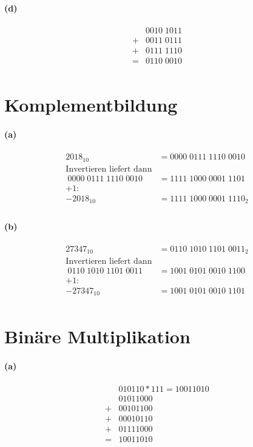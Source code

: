 \documentclass[a4paper]{article}
\begin{document}
\paragraph{(d)}
\begin{align*}
    &0010\;1011\\
    +&0011\;0111\\
    +&0111\;1110\\
    =&0110\;0010\\
\end{align*}


\section{Komplementbildung}
\paragraph{(a)}
\begin{align*}
    2018_{10}&=0000\;0111\;1110\;0010\\
    \text{Invertieren liefert dann}\\
    ~0000\;0111\;1110\;0010 &= 1111\;1000\;0001\;1101\\
    \text{+1:}\\
    -2018_{10} &= 1111\;1000\;0001\;1110_2\\
\end{align*}

\paragraph{(b)}
\begin{align*}
    27347_{10}&=0110\;1010\;1101\;0011_2\\
    \text{Invertieren liefert dann}\\
    ~0110\;1010\;1101\;0011 &= 1001\;0101\;0010\;1100\\
    \text{+1:}\\
    -27347_{10} &= 1001\;0101\;0010\;1101\\
\end{align*}

\section{Binäre Multiplikation}
\paragraph{(a)}
\begin{align*}
    &010110*111=10011010\\
    &01011000\\
    +&00101100\\
    +&00010110\\
    +&01111000\\
    =&10011010\\
\end{align*}
\end{document}
